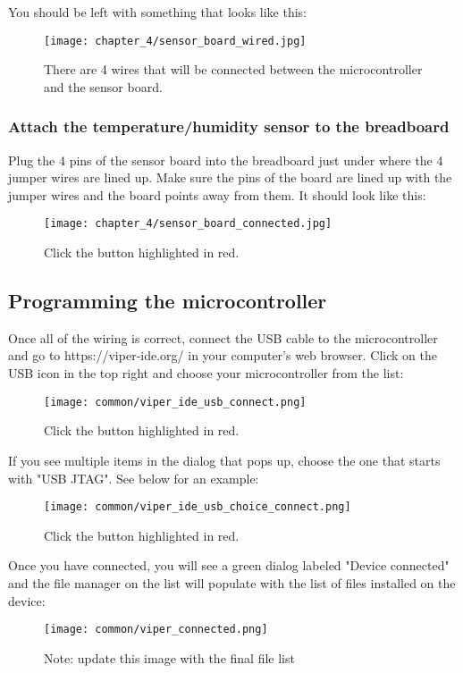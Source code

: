 You should be left with something that looks like this:
\begin{figure}[H]
    \centering
    \texttt{[image: chapter\_4/sensor\_board\_wired.jpg]}
    \caption{There are 4 wires that will be connected between the microcontroller and the sensor board.}
\end{figure}

\subsubsection{Attach the temperature/humidity sensor to the breadboard}
Plug the 4 pins of the sensor board into the breadboard just under where the 4 jumper wires are lined up. Make sure the pins of the board are lined up with the jumper wires and the board points away from them. It should look like this:

\begin{figure}[H]
    \centering
    \texttt{[image: chapter\_4/sensor\_board\_connected.jpg]}
    \caption{Click the button highlighted in red.}
\end{figure}

\subsection{Programming the microcontroller}
Once all of the wiring is correct, connect the USB cable to the microcontroller and go to https://viper-ide.org/ in your computer's web browser. Click on the USB icon in the top right and choose your microcontroller from the list:

\begin{figure}[H]
    \centering
    \texttt{[image: common/viper\_ide\_usb\_connect.png]}
    \caption{Click the button highlighted in red.}
\end{figure}

If you see multiple items in the dialog that pops up, choose the one that starts with "USB JTAG". See below for an example:
\begin{figure}[H]
    \centering
    \texttt{[image: common/viper\_ide\_usb\_choice\_connect.png]}
    \caption{Click the button highlighted in red.}
\end{figure}

Once you have connected, you will see a green dialog labeled "Device connected" and the file manager on the list will populate with the list of files installed on the device:
\begin{figure}[H]
    \centering
    \texttt{[image: common/viper\_connected.png]}
    \caption{Note: update this image with the final file list}
\end{figure}


